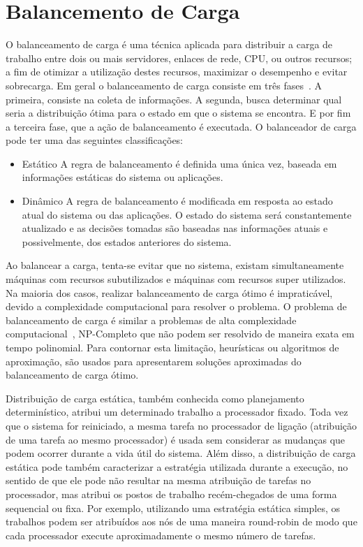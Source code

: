 \section{Balancemento de Carga}\label{intro:carga}

O balanceamento de carga é uma técnica aplicada para distribuir a carga de trabalho entre dois ou mais servidores, enlaces de rede, CPU, ou outros recursos; a fim de otimizar a utilização destes recursos, maximizar o desempenho e evitar sobrecarga. Em geral o balanceamento de carga consiste em três fases~\cite{carga}. A primeira, consiste na coleta de informações. A segunda, busca determinar qual seria a distribuição ótima para o estado em que o sistema se encontra. E por fim a terceira fase, que a ação de balanceamento é executada. O balanceador de carga pode ter uma das seguintes classificações:

\begin{itemize}
\item Estático A regra de balanceamento é definida uma única vez, baseada em informações estáticas do sistema ou aplicações.

\item Dinâmico A regra de balanceamento é modificada em resposta ao estado atual do sistema ou das aplicações. O estado do sistema será constantemente atualizado e as decisões tomadas são baseadas nas informações atuais e possivelmente, dos estados anteriores do sistema.
\end{itemize}

Ao balancear a carga, tenta-se evitar que no sistema, existam simultaneamente máquinas com recursos subutilizados e máquinas com recursos super utilizados. Na maioria dos casos, realizar balanceamento de carga ótimo é impraticável, devido a complexidade computacional para resolver o problema. O problema de balanceamento de carga  é similar a problemas de alta complexidade computacional~\cite{virtual}, NP-Completo que não podem ser resolvido de maneira exata em tempo polinomial. Para contornar esta limitação, heurísticas ou algoritmos de aproximação, são usados para apresentarem soluções aproximadas do balanceamento de carga ótimo.


Distribuição de carga estática, também conhecida como planejamento determinístico, atribui um determinado trabalho a processador fixado. Toda vez que o sistema for reiniciado, a mesma tarefa no processador de ligação (atribuição de uma tarefa ao mesmo processador) é usada sem considerar as mudanças que podem ocorrer durante a vida útil do sistema. Além disso, a distribuição de carga estática pode também caracterizar a estratégia utilizada durante a execução, no sentido de que ele pode não resultar na mesma atribuição de tarefas no processador, mas atribui os postos de trabalho recém-chegados de uma forma sequencial ou fixa. Por exemplo, utilizando uma estratégia estática simples, os trabalhos podem ser atribuídos aos nós de uma maneira round-robin de modo que cada processador execute aproximadamente o mesmo número de tarefas. 

